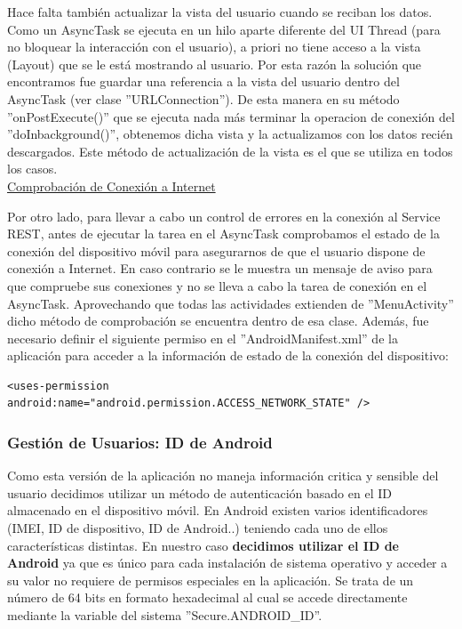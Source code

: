 	Hace falta también actualizar la vista del usuario cuando se reciban los datos. Como un AsyncTask se ejecuta en un hilo aparte diferente del UI Thread (para no bloquear la interacción con el usuario), a priori no tiene acceso a la vista (Layout) que se le está mostrando al usuario. Por esta razón la solución que encontramos fue guardar una referencia a la vista del usuario dentro del AsyncTask (ver clase ''URLConnection''). De esta manera en su método ''onPostExecute()'' que se ejecuta nada más terminar la operacion de conexión del ''doInbackground()'', obtenemos dicha vista y la actualizamos con los datos recién descargados. Este método de actualización de la vista es el que se utiliza en todos los casos. \\
		
		\underline{Comprobación de Conexión a Internet}
		
		Por otro lado, para llevar a cabo un control de errores en la conexión al Service REST, antes de ejecutar la tarea en el AsyncTask comprobamos el estado de la conexión del dispositivo móvil para asegurarnos de que el usuario dispone de conexión a Internet. En caso contrario se le muestra un mensaje de aviso para que compruebe sus conexiones y no se lleva a cabo la tarea de conexión en el AsyncTask. Aprovechando que todas las actividades extienden de ''MenuActivity'' dicho método de comprobación se encuentra dentro de esa clase. Además, fue necesario definir el siguiente permiso en el ''AndroidManifest.xml'' de la aplicación para acceder a la información de estado de la conexión del dispositivo:
		
		  \lstset{language=XML, breaklines=true, autogobble=true, basicstyle=\ttfamily\footnotesize}
	  \begin{lstlisting}[frame=single]
	  <uses-permission android:name="android.permission.ACCESS_NETWORK_STATE" />
	  \end{lstlisting}
		
	\subsubsection{Gestión de Usuarios: ID de Android} \label{sssec:idUser}
	
		Como esta versión de la aplicación no maneja información critica y sensible del usuario decidimos utilizar un método de autenticación basado en el ID almacenado en el dispositivo móvil. En Android existen varios identificadores (IMEI, ID de dispositivo, ID de Android..) teniendo cada uno de ellos características distintas. En nuestro caso \textbf{decidimos utilizar el ID de Android} \cite{ref:android_secure} ya que es único para cada instalación de sistema operativo y acceder a su valor no requiere de permisos especiales en la aplicación. Se trata de un número de 64 bits en formato hexadecimal al cual se accede directamente mediante la variable del sistema ''Secure.ANDROID\_ID''.
		

